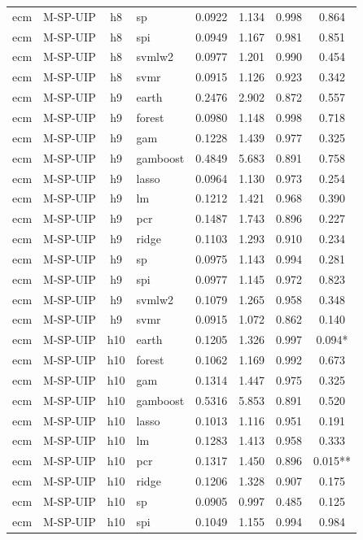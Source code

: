 \begin{ThreePartTable}
\begin{longtable}[t]{llclcccc}
ecm & M-SP-UIP & h8 & sp & 0.0922 & 1.134 & 0.998 & 0.864\\
ecm & M-SP-UIP & h8 & spi & 0.0949 & 1.167 & 0.981 & 0.851\\
ecm & M-SP-UIP & h8 & svmlw2 & 0.0977 & 1.201 & 0.990 & 0.454\\
ecm & M-SP-UIP & h8 & svmr & 0.0915 & 1.126 & 0.923 & 0.342\\
\addlinespace
ecm & M-SP-UIP & h9 & earth & 0.2476 & 2.902 & 0.872 & 0.557\\
ecm & M-SP-UIP & h9 & forest & 0.0980 & 1.148 & 0.998 & 0.718\\
ecm & M-SP-UIP & h9 & gam & 0.1228 & 1.439 & 0.977 & 0.325\\
ecm & M-SP-UIP & h9 & gamboost & 0.4849 & 5.683 & 0.891 & 0.758\\
ecm & M-SP-UIP & h9 & lasso & 0.0964 & 1.130 & 0.973 & 0.254\\
ecm & M-SP-UIP & h9 & lm & 0.1212 & 1.421 & 0.968 & 0.390\\
ecm & M-SP-UIP & h9 & pcr & 0.1487 & 1.743 & 0.896 & 0.227\\
ecm & M-SP-UIP & h9 & ridge & 0.1103 & 1.293 & 0.910 & 0.234\\
ecm & M-SP-UIP & h9 & sp & 0.0975 & 1.143 & 0.994 & 0.281\\
ecm & M-SP-UIP & h9 & spi & 0.0977 & 1.145 & 0.972 & 0.823\\
ecm & M-SP-UIP & h9 & svmlw2 & 0.1079 & 1.265 & 0.958 & 0.348\\
ecm & M-SP-UIP & h9 & svmr & 0.0915 & 1.072 & 0.862 & 0.140\\
\addlinespace
ecm & M-SP-UIP & h10 & earth & 0.1205 & 1.326 & 0.997 & 0.094*\\
ecm & M-SP-UIP & h10 & forest & 0.1062 & 1.169 & 0.992 & 0.673\\
ecm & M-SP-UIP & h10 & gam & 0.1314 & 1.447 & 0.975 & 0.325\\
ecm & M-SP-UIP & h10 & gamboost & 0.5316 & 5.853 & 0.891 & 0.520\\
ecm & M-SP-UIP & h10 & lasso & 0.1013 & 1.116 & 0.951 & 0.191\\
ecm & M-SP-UIP & h10 & lm & 0.1283 & 1.413 & 0.958 & 0.333\\
ecm & M-SP-UIP & h10 & pcr & 0.1317 & 1.450 & 0.896 & 0.015**\\
ecm & M-SP-UIP & h10 & ridge & 0.1206 & 1.328 & 0.907 & 0.175\\
ecm & M-SP-UIP & h10 & sp & 0.0905 & 0.997 & 0.485 & 0.125\\
ecm & M-SP-UIP & h10 & spi & 0.1049 & 1.155 & 0.994 & 0.984\\

\end{longtable}
\end{ThreePartTable}
